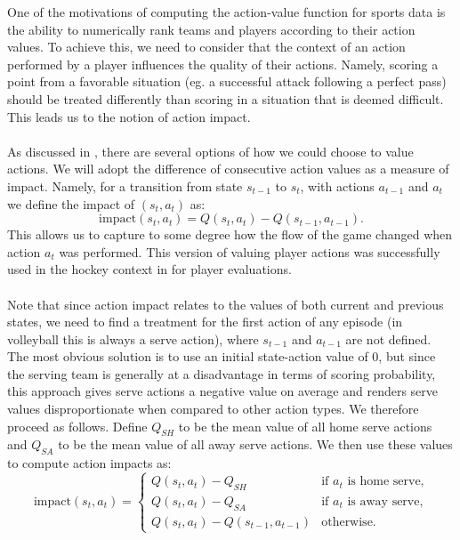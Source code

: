 \documentclass{sfuthesis}
\begin{document}
One of the motivations of computing the action-value function for sports data is the ability to numerically rank teams and players according to their action values. To achieve this, we need to consider that the context of an action performed by a player influences the quality of their actions. Namely, scoring a point from a favorable situation (eg. a successful attack following a perfect pass) should be treated differently than scoring in a situation that is deemed difficult. This leads us to the notion of action impact.\\\\
As discussed in \cite{routley2015markov}, there are several options of how we could choose to value actions. We will adopt the difference of consecutive action values as a measure of impact. Namely, for a transition from state $s_{t-1}$ to $s_t$, with actions $a_{t-1}$ and $a_t$ we define the impact of $(s_t, a_t)$ as:
\begin{equation}
\text{impact}(s_t,a_t) = Q(s_t,a_t) - Q(s_{t-1},a_{t-1}).
\label{eq:action_impact}
\end{equation}
This allows us to capture to some degree how the flow of the game changed when action $a_t$ was performed. This version of valuing player actions was successfully used in the hockey context in \cite{liu2018deep} for player evaluations.\\\\
Note that since action impact relates to the values of both current and previous states, we need to find a treatment for the first action of any episode (in volleyball this is always a serve action), where $s_{t-1}$ and $a_{t-1}$ are not defined. The most obvious solution is to use an initial state-action value of 0, but since the serving team is generally at a disadvantage in terms of scoring probability, this approach gives serve actions a negative value on average and renders serve values disproportionate when compared to other action types. We therefore proceed as follows. Define $Q_{SH}$ to be the mean value of all home serve actions and $Q_{SA}$ to be the mean value of all away serve actions. We then use these values to compute action impacts as:
\begin{equation}
\text{impact}(s_t,a_t) =
	\begin{cases} 
	Q(s_t,a_t) - Q_{SH} & \text{if } a_t \text{ is home serve,} \\
	Q(s_t,a_t) - Q_{SA} & \text{if } a_t \text{ is away serve,} \\
	Q(s_t,a_t) - Q(s_{t-1},a_{t-1}) & \text{otherwise.} 
	\end{cases}
	\label{eq:action_impact2}
\end{equation}
\end{document}

